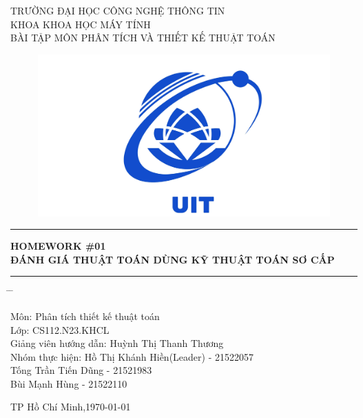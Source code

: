 \documentclass[10pt,a4paper]{article}
\begin{document}
\fontsize{18}{30}\selectfont
{\centering TRƯỜNG ĐẠI HỌC CÔNG NGHỆ THÔNG TIN \\
KHOA KHOA HỌC MÁY TÍNH \\
BÀI TẬP MÔN PHÂN TÍCH VÀ THIẾT KẾ THUẬT TOÁN
\par}
\vspace{0.5 cm}
\begin{center}
    \begin{figure}[htp]
     \centering\includegraphics[scale=.3]{images/logo_uit.jpg} \\
    \end{figure}
    \vspace{1 cm}
    
    \par\noindent\rule{\textwidth}{0.5pt}
    \fontsize{14}{30}\selectfont
    {\centering \textbf{HOMEWORK \#01 \\
    ĐÁNH GIÁ THUẬT TOÁN DÙNG KỸ THUẬT TOÁN SƠ CẤP} \\
    }
    \par\noindent\rule{\textwidth}{0.5pt}
    
    \fontsize{14}{30}\selectfont
    \begin{tabbing}
    \hspace{2 in} \= \hspace{2 in} \= \kill

    Môn: \> Phân tích thiết kế thuật toán \\
    Lớp: \> CS112.N23.KHCL \\
    Giảng viên hướng dẫn: \> Huỳnh Thị Thanh Thương \\
    Nhóm thực hiện: \> Hồ Thị Khánh Hiền(Leader) - 21522057 \\
    \hspace{5.3 cm}Tống Trần Tiến Dũng - 21521983 \\
    \hspace{5.3 cm}Bùi Mạnh Hùng - 21522110 \\
    \end{tabbing}  

    \begin{center}
    \fontsize{14}{30}\selectfont
     TP Hồ Chí Minh,{\today}
    \end{center}
\end{center}
\newpage
\fontsize{13}{15}\selectfont
\tableofcontents
\clearpage
\end{document}

